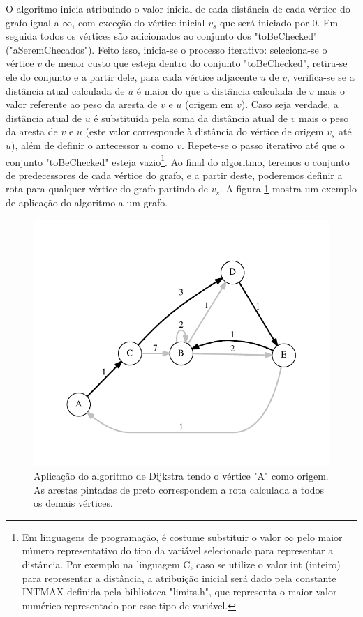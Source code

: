 O algoritmo inicia atribuindo o valor inicial de cada distância de cada vértice do grafo igual a $\infty$, com exceção do vértice inicial $v_{s}$ que será iniciado por 0. Em seguida todos os vértices são adicionados ao conjunto dos "toBeChecked" ("aSeremChecados"). Feito isso, inicia-se o processo iterativo: seleciona-se o vértice $v$ de menor custo que esteja dentro do conjunto "toBeChecked", retira-se ele do conjunto e a partir dele, para cada vértice adjacente $u$ de $v$, verifica-se se a distância atual calculada de $u$ é maior do que a distância calculada de $v$ mais o valor referente ao peso da aresta de $v$ e $u$ (origem em $v$). Caso seja verdade, a distância atual de $u$ é substituída pela soma da distância atual de $v$ mais o peso da aresta de $v$ e $u$ (este valor corresponde à distância do vértice de origem $v_{s}$ até $u$), além de definir o antecessor $u$ como $v$. Repete-se o passo iterativo até que o conjunto "toBeChecked" esteja vazio\footnote{Em linguagens de programação, é costume substituir o valor $\infty$ pelo maior número representativo do tipo da variável selecionado para representar a distância. Por exemplo na linguagem C, caso se utilize o valor int (inteiro) para representar a distância, a atribuição inicial será dado pela constante INT\underline{\space}MAX  definida pela biblioteca "limits.h", que representa o maior valor numérico representado por esse tipo de variável.}.
\newpage
Ao final do algoritmo, teremos o conjunto de predecessores de cada vértice do grafo, e a partir deste, poderemos definir a rota para qualquer vértice do grafo partindo de $v_{s}$. A figura \ref{fig-dijkstra-algoritmo-grafo} mostra um exemplo de aplicação do algoritmo a um grafo.

\begin{figure}[H]
\centering
\includegraphics[width=1.\textwidth]{figuras/grafo-dijkstra} 
\caption{Aplicação do algoritmo de Dijkstra tendo o vértice "A" como origem. As arestas pintadas de preto correspondem a rota calculada a todos os demais vértices.}
\label{fig-dijkstra-algoritmo-grafo}
\end{figure}

